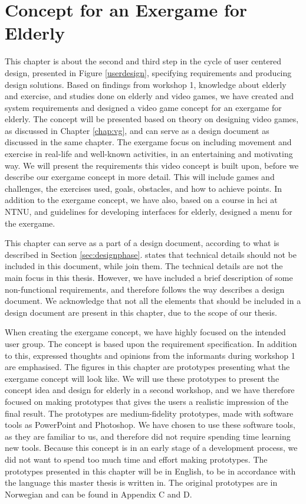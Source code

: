 \chapter{Concept for an Exergame for Elderly}
\label{chap:concept}
This chapter is about the second and third step in the cycle of user centered design, presented in Figure \ref{userdesign}, specifying requirements and producing design solutions. Based on findings from workshop 1, knowledge about elderly and exercise, and studies done on elderly and video games, we have created and system requirements and designed a video game concept for an exergame for elderly. The concept will be presented based on theory on designing video games, as discussed in Chapter \ref{chap:vg}, and can serve as a design document as discussed in the same chapter. The exergame focus on including movement and exercise in real-life and well-known activities, in an entertaining and motivating way. We will present the requirements this video concept is built upon, before we describe our exergame concept in more detail. This will include games and challenges, the exercises used, goals, obstacles, and how to achieve points. In addition to the exergame concept, we have also, based on a course in \ac{hci} at NTNU, and guidelines for developing interfaces for elderly, designed a menu for the exergame. 

This chapter can serve as a part of a design document, according to what is described in Section \ref{sec:designphase}. \cite{gamedesign} states that technical details should not be included in this document, while \cite{understandingvg} join them. The technical details are not the main focus in this thesis. However, we have included a brief description of some non-functional requirements, and therefore follows the way \cite{understandingvg} describes a design document. We acknowledge that not all the elements that should be included in a design document are present in this chapter, due to the scope of our thesis.

When creating the exergame concept, we have highly focused on the intended user group. The concept is based upon the requirement specification. In addition to this, expressed thoughts and opinions from the informants during workshop 1 are emphasised. The figures in this chapter are prototypes presenting what the exergame concept will look like. We will use these prototypes to present the concept idea and design for elderly in a second workshop, and we have therefore focused on making prototypes that gives the users a realistic impression of the final result. The prototypes are medium-fidelity prototypes, made with software tools as PowerPoint and Photoshop. We have chosen to use these software tools, as they are familiar to us, and therefore did not require spending time learning new tools. Because this concept is in an early stage of a development process, we did not want to spend too much time and effort making prototypes. The prototypes presented in this chapter will be in English, to be in accordance with the language this master thesis is written in. The original prototypes are in Norwegian and can be found in Appendix C and D. 

